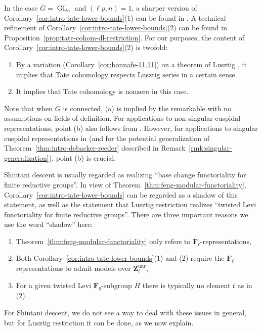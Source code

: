 \documentclass[reqno]{amsart}
\numberwithin{equation}{subsection}
\newcommand{\F}{\mathbf{F}}
\newcommand{\Z}{\mathbf{Z}}
\newcommand{\ol}[1]{\overline{#1}}
\DeclareMathOperator{\GL}{GL}
\DeclareMathOperator{\unr}{unr}
\theoremstyle{remark}
\numberwithin{equation}{subsection}
\numberwithin{figure}{subsection}
\begin{document}
In the case $\ol G = \GL_n$ and $(\ell p, n) = 1$, a sharper version of Corollary~\ref{cor:intro-tate-lower-bounds}(1) can be found in \cite[Theorem~13]{Ron16}. A technical refinement of Corollary~\ref{cor:intro-tate-lower-bounds}(2) can be found in Proposition~\ref{prop:tate-cohom-dl-restriction}. For our purposes, the content of Corollary~\ref{cor:intro-tate-lower-bounds}(2) is twofold:
\begin{enumerate}[label=(\alph*)]
    \item By a variation (Corollary~\ref{cor:bonnafe-11.11}) on a theorem of Lusztig \cite[Corollaire~11.11]{Bon06}, it implies that Tate cohomology respects Lusztig series in a certain sense.
    \item It implies that Tate cohomology is nonzero in this case.
\end{enumerate}
Note that when $\ol G$ is connected, (a) is implied by the remarkable \cite[Th\'eor\`eme 3.2]{BM89} with no assumptions on fields of definition. For applications to non-singular cuspidal representations, point (b) also follows from \cite[Th\'eor\`eme 3.2]{BM89}. However, for applications to singular cuspidal representations in \cite{CF26b} (and for the potential generalization of Theorem~\ref{thm:intro-debacker-reeder} described in Remark~\ref{rmk:singular-generalization}), point (b) is crucial.

Shintani descent is usually regarded as realizing ``base change functoriality for finite reductive groups''. In view of Theorem~\ref{thm:feng-modular-functoriality}, Corollary~\ref{cor:intro-tate-lower-bounds} can be regarded as a shadow of this statement, as well as the statement that Lusztig restriction realizes ``twisted Levi functoriality for finite reductive groups''. There are three important reasons we use the word ``shadow'' here:
\begin{enumerate}[label=(\Alph*)]
    \item Theorem~\ref{thm:feng-modular-functoriality} only refers to $\ol\F_\ell$-representations,
    \item Both Corollary~\ref{cor:intro-tate-lower-bounds}(1) and (2) require the $\ol\F_\ell$-representations to admit models over $\Z_\ell^{\unr}$,
    \item For a given twisted Levi $\F_q$-subgroup $\ol H$ there is typically no element $t$ as in (2).
\end{enumerate}
For Shintani descent, we do not see a way to deal with these issues in general, but for Lusztig restriction it can be done, as we now explain.
\end{document}
